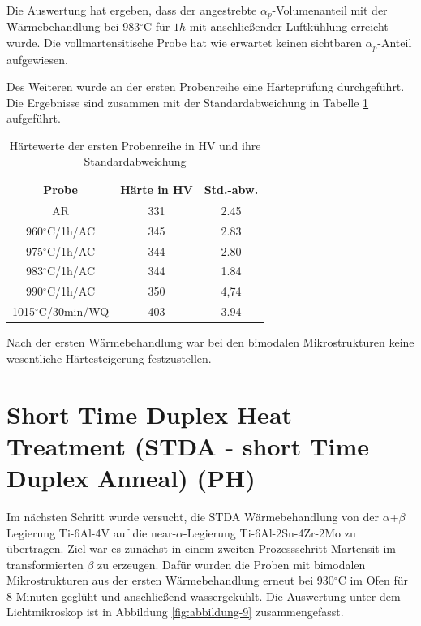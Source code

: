 \pagebreak

Die Auswertung hat ergeben, dass der angestrebte $\alpha_p$-Volumenanteil mit der Wärmebehandlung bei 983$^\circ$C für $1 h$ mit anschließender Luftkühlung erreicht wurde. Die vollmartensitische Probe hat wie erwartet keinen sichtbaren $\alpha_p$-Anteil aufgewiesen.

Des Weiteren wurde an der ersten Probenreihe eine Härteprüfung durchgeführt. Die Ergebnisse sind zusammen mit der Standardabweichung in Tabelle \ref{Tabelle 5} aufgeführt. 

\begin{table}[h]
	\centering
	\begin{tabular}{|c|c|c|}
		\hline 
		Probe & Härte in HV &  Std.-abw. \\ 
		\hline 
		AR & 331 & 2.45 \\ 
		\hline 
		960$^\circ$C/1h/AC & 345 & 2.83 \\ 
		\hline 
		975$^\circ$C/1h/AC & 344 & 2.80 \\ 
		\hline 
		983$^\circ$C/1h/AC & 344 & 1.84 \\ 
		\hline 
		990$^\circ$C/1h/AC & 350 & 4,74 \\ 
		\hline 
		1015$^\circ$C/30min/WQ & 403 & 3.94 \\ 
		\hline 
	\end{tabular} 
    \caption{Härtewerte der ersten Probenreihe in HV und ihre Standardabweichung}
    \label{Tabelle 5}
\end{table}

Nach der ersten Wärmebehandlung war bei den bimodalen Mikrostrukturen keine wesentliche Härtesteigerung festzustellen.

\section{Short Time Duplex Heat Treatment (STDA - short Time Duplex Anneal) (PH)}

Im nächsten Schritt wurde versucht, die STDA Wärmebehandlung von der $\alpha$+$\beta$ Legierung Ti-6Al-4V auf die near-$\alpha$-Legierung Ti-6Al-2Sn-4Zr-2Mo zu übertragen. Ziel war es zunächst in einem zweiten Prozessschritt Martensit im transformierten $\beta$ zu erzeugen. Dafür wurden die Proben mit bimodalen Mikrostrukturen aus der ersten Wärmebehandlung erneut bei 930$^\circ$C im Ofen für 8 Minuten geglüht und anschließend wassergekühlt. Die Auswertung unter dem Lichtmikroskop ist in Abbildung \ref{fig:abbildung-9} zusammengefasst.

